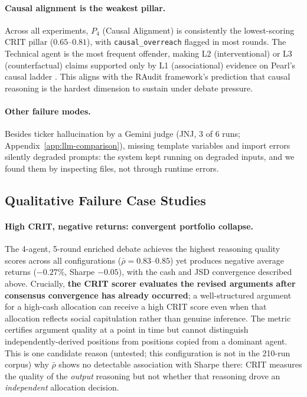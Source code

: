 \documentclass{article}
\begin{document}
\paragraph{Causal alignment is the weakest pillar.} \vspace{-0.2cm}
Across all experiments, $P_4$ (Causal Alignment) is consistently the lowest-scoring CRIT pillar ($0.65$--$0.81$), with \texttt{causal\_overreach} flagged in most rounds. The Technical agent is the most frequent offender, making L2 (interventional) or L3 (counterfactual) claims supported only by L1 (associational) evidence on Pearl's causal ladder \citep{pearl2009causality}. This aligns with the RAudit framework's prediction that causal reasoning is the hardest dimension to sustain under debate pressure.

\paragraph{Other failure modes.}
Besides ticker hallucination by a Gemini judge (JNJ, 3 of 6 runs; Appendix~\ref{app:llm-comparison}), missing template variables and import errors silently degraded prompts: the system kept running on degraded inputs, and we found them by inspecting files, not through runtime errors.

\vspace{-0.2cm}
\subsection{Qualitative Failure Case Studies}
\vspace{-0.2cm}


\paragraph{High CRIT, negative returns: convergent portfolio collapse.}
The 4-agent, 5-round enriched debate achieves the highest reasoning quality scores across all configurations ($\bar{\rho}=0.83$--$0.85$) yet produces negative average returns ($-0.27\%$, Sharpe $-0.05$), with the cash and JSD convergence described above. Crucially, \textbf{the CRIT scorer evaluates the revised arguments after consensus convergence has already occurred}; a well-structured argument for a high-cash allocation can receive a high CRIT score even when that allocation reflects social capitulation rather than genuine inference. The metric certifies argument quality at a point in time but cannot distinguish independently-derived positions from positions copied from a dominant agent. This is one candidate reason (untested; this configuration is not in the 210-run corpus) why $\bar{\rho}$ shows no detectable association with Sharpe there: CRIT measures the quality of the \emph{output} reasoning but not whether that reasoning drove an \emph{independent} allocation decision.
\end{document}
